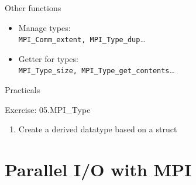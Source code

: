 \documentclass[aspectratio=43]{beamer}
\begin{document}
\begin{frame}[fragile]{Other functions}
\begin{itemize}
    \item Manage types:\\\hspace{1cm}\verb+MPI_Comm_extent, MPI_Type_dup+\ldots
    \item Getter for types:\\\hspace{1cm}\verb+MPI_Type_size, MPI_Type_get_contents+\ldots
\end{itemize}
\end{frame}


\begin{frame}{Practicals}
    \begin{brown2block}{Exercise: 05.MPI\_Type}
    \begin{enumerate}
    \item Create a derived datatype based on a struct
    \end{enumerate}
    \end{brown2block}
\end{frame}



\section{Parallel I/O with MPI}

\end{document}
